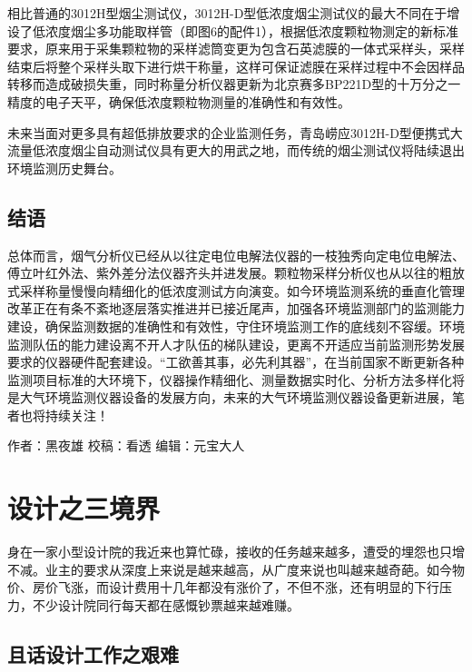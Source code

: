 \documentclass[]{book}
\begin{document}
相比普通的3012H型烟尘测试仪，3012H-D型低浓度烟尘测试仪的最大不同在于增设了低浓度烟尘多功能取样管（即图6的配件1），根据低浓度颗粒物测定的新标准要求，原来用于采集颗粒物的采样滤筒变更为包含石英滤膜的一体式采样头，采样结束后将整个采样头取下进行烘干称量，这样可保证滤膜在采样过程中不会因样品转移而造成破损失重，同时称量分析仪器更新为北京赛多BP221D型的十万分之一精度的电子天平，确保低浓度颗粒物测量的准确性和有效性。

未来当面对更多具有超低排放要求的企业监测任务，青岛崂应3012H-D型便携式大流量低浓度烟尘自动测试仪具有更大的用武之地，而传统的烟尘测试仪将陆续退出环境监测历史舞台。

\hypertarget{ux7ed3ux8bed-13}{%
\subsection{结语}\label{ux7ed3ux8bed-13}}

总体而言，烟气分析仪已经从以往定电位电解法仪器的一枝独秀向定电位电解法、傅立叶红外法、紫外差分法仪器齐头并进发展。颗粒物采样分析仪也从以往的粗放式采样称量慢慢向精细化的低浓度测试方向演变。如今环境监测系统的垂直化管理改革正在有条不紊地逐层落实推进并已接近尾声，加强各环境监测部门的监测能力建设，确保监测数据的准确性和有效性，守住环境监测工作的底线刻不容缓。环境监测队伍的能力建设离不开人才队伍的梯队建设，更离不开适应当前监测形势发展要求的仪器硬件配套建设。``工欲善其事，必先利其器''，在当前国家不断更新各种监测项目标准的大环境下，仪器操作精细化、测量数据实时化、分析方法多样化将是大气环境监测仪器设备的发展方向，未来的大气环境监测仪器设备更新进展，笔者也将持续关注！

作者：黑夜雄
校稿：看透
编辑：元宝大人

\hypertarget{ux8bbeux8ba1ux4e4bux4e09ux5883ux754c}{%
\section{设计之三境界}\label{ux8bbeux8ba1ux4e4bux4e09ux5883ux754c}}

身在一家小型设计院的我近来也算忙碌，接收的任务越来越多，遭受的埋怨也只增不减。业主的要求从深度上来说是越来越高，从广度来说也叫越来越奇葩。如今物价、房价飞涨，而设计费用十几年都没有涨价了，不但不涨，还有明显的下行压力，不少设计院同行每天都在感慨钞票越来越难赚。

\hypertarget{ux4e14ux8bddux8bbeux8ba1ux5de5ux4f5cux4e4bux8270ux96be}{%
\subsection{且话设计工作之艰难}\label{ux4e14ux8bddux8bbeux8ba1ux5de5ux4f5cux4e4bux8270ux96be}}
\end{document}
